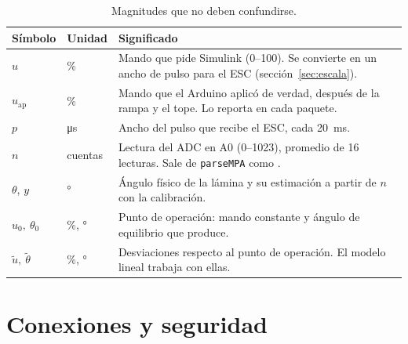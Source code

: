 \documentclass[11pt,letterpaper]{article}
\newcommand{\sen}[1]{\texttt{\detokenize{#1}}}             %
\begin{document}
\begin{table}[H]\centering\small
\caption{Magnitudes que no deben confundirse.}\label{tab:magnitudes}
\begin{tabularx}{\linewidth}{@{}l l >{\raggedright\arraybackslash}X@{}}\toprule
\textbf{Símbolo} & \textbf{Unidad} & \textbf{Significado}\\\midrule
$u$ & \% & Mando que pide Simulink (0--100). Se convierte en un ancho de pulso para el ESC (sección~\ref{sec:escala}).\\
$u_\text{ap}$ & \% & Mando que el Arduino aplicó de verdad, después de la rampa y el tope. Lo reporta en cada paquete.\\
$p$ & \si{\micro s} & Ancho del pulso que recibe el ESC, cada \SI{20}{ms}.\\
$n$ & cuentas & Lectura del ADC en A0 (0--1023), promedio de 16 lecturas. Sale de \texttt{parseMPA} como \sen{adc}.\\
$\theta$, $y$ & ° & Ángulo físico de la lámina y su estimación a partir de $n$ con la calibración.\\
$u_0,\ \theta_0$ & \%, ° & Punto de operación: mando constante y ángulo de equilibrio que produce.\\
$\tilde u,\ \tilde\theta$ & \%, ° & Desviaciones respecto al punto de operación. El modelo lineal trabaja con ellas.\\\bottomrule
\end{tabularx}
\end{table}

\section{Conexiones y seguridad}\label{sec:conexiones}
\end{document}
